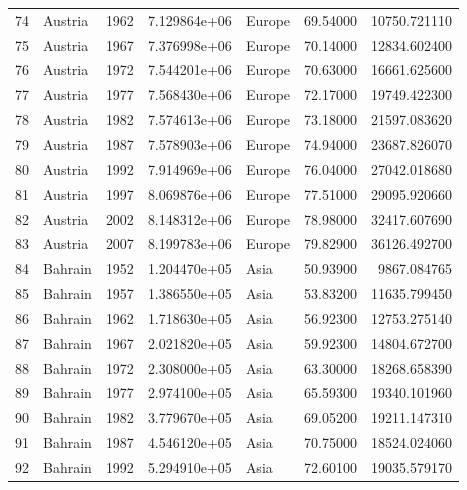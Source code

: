 \documentclass[
  letterpaper,
  DIV=11,
  numbers=noendperiod]{scrreprt}
\begin{document}
\begin{tabular}{llrrlrr}
74   &                   Austria &  1962 &  7.129864e+06 &    Europe &  69.54000 &   10750.721110 \\
75   &                   Austria &  1967 &  7.376998e+06 &    Europe &  70.14000 &   12834.602400 \\
76   &                   Austria &  1972 &  7.544201e+06 &    Europe &  70.63000 &   16661.625600 \\
77   &                   Austria &  1977 &  7.568430e+06 &    Europe &  72.17000 &   19749.422300 \\
78   &                   Austria &  1982 &  7.574613e+06 &    Europe &  73.18000 &   21597.083620 \\
79   &                   Austria &  1987 &  7.578903e+06 &    Europe &  74.94000 &   23687.826070 \\
80   &                   Austria &  1992 &  7.914969e+06 &    Europe &  76.04000 &   27042.018680 \\
81   &                   Austria &  1997 &  8.069876e+06 &    Europe &  77.51000 &   29095.920660 \\
82   &                   Austria &  2002 &  8.148312e+06 &    Europe &  78.98000 &   32417.607690 \\
83   &                   Austria &  2007 &  8.199783e+06 &    Europe &  79.82900 &   36126.492700 \\
84   &                   Bahrain &  1952 &  1.204470e+05 &      Asia &  50.93900 &    9867.084765 \\
85   &                   Bahrain &  1957 &  1.386550e+05 &      Asia &  53.83200 &   11635.799450 \\
86   &                   Bahrain &  1962 &  1.718630e+05 &      Asia &  56.92300 &   12753.275140 \\
87   &                   Bahrain &  1967 &  2.021820e+05 &      Asia &  59.92300 &   14804.672700 \\
88   &                   Bahrain &  1972 &  2.308000e+05 &      Asia &  63.30000 &   18268.658390 \\
89   &                   Bahrain &  1977 &  2.974100e+05 &      Asia &  65.59300 &   19340.101960 \\
90   &                   Bahrain &  1982 &  3.779670e+05 &      Asia &  69.05200 &   19211.147310 \\
91   &                   Bahrain &  1987 &  4.546120e+05 &      Asia &  70.75000 &   18524.024060 \\
92   &                   Bahrain &  1992 &  5.294910e+05 &      Asia &  72.60100 &   19035.579170 \\

\end{tabular}
\end{document}

